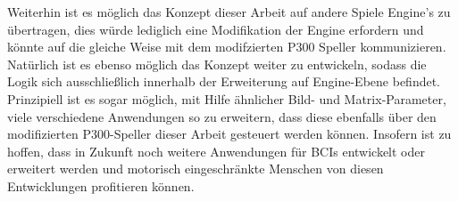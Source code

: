 Weiterhin ist es möglich das Konzept dieser Arbeit auf andere Spiele Engine's zu übertragen, 
dies würde lediglich eine Modifikation der Engine erfordern und könnte auf die gleiche Weise mit dem modifzierten P300 Speller kommunizieren.
Natürlich ist es ebenso möglich das Konzept weiter zu entwickeln, sodass die Logik sich ausschließlich innerhalb der Erweiterung auf Engine-Ebene befindet.\\

Prinzipiell ist es sogar möglich, mit Hilfe ähnlicher Bild- und Matrix-Parameter, 
viele verschiedene Anwendungen so zu erweitern, 
dass diese ebenfalls über den modifizierten P300-Speller dieser Arbeit gesteuert werden können.
Insofern ist zu hoffen, dass in Zukunft noch weitere Anwendungen für \acs{BCI}s entwickelt oder erweitert werden und motorisch eingeschränkte Menschen von diesen Entwicklungen profitieren können.\\







